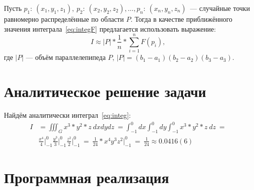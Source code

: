 \documentclass{article}
\begin{document}
    Пусть \(p_1:\ (x_1, y_1, z_1),\ p_2:\ (x_2, y_2, z_2),\ldots, p_n:\ (x_n, y_n, z_n)\)~---
    случайные точки равномерно распределённые по области \(P\). Тогда в качестве приближённого
    значения интеграла~\ref{eq:integF} предлагается использовать выражение:
    \begin{equation}
        I \approx |P| * \frac{1}{n} *\sum_{i=1}^n F(p_i),
    \end{equation}
    где \(|P|\) — объём параллелепипеда \(P\), \(|P| = (b_1 − a_1)(b_2 − a_2)(b_3 − a_3)\).
\section{Аналитическое решение задачи}
    Найдём аналитически интеграл~\ref{eq:integ}:
    \begin{equation}
        \begin{aligned}
        I &= \iiint_G x^3*y^2*z\ dxdydz\ = \int_{-1}^{0} dx\int_{-1}^{0} dy \int_{-1}^{0} x^3*y^2*z\ dz\ =\\
          &\frac{x^4}{4}\biggr\rvert_{-1}^{0}\frac{y^3}{3}\biggr\rvert_{-1}^{0}\frac{z^2}{2}\biggr\rvert_{-1}^{0}\ =\ 
            \frac{1}{24} * x^4y^3z^2\biggr\rvert_{-1}^{0}\ =\ \frac{1}{24} \approx 0.0416(6)
        \end{aligned}
    \end{equation}
\section{Программная реализация}
\end{document}
